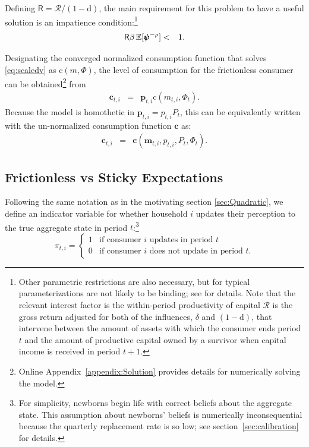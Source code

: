 \documentclass[titlepage]{./econtex}
\begin{document}
Defining $\mathsf{R} = \mathscr{R}\big/(1-\mathrm{d})$, the main requirement for this problem to have a useful solution is an impatience condition:\footnote{Other parametric restrictions are also necessary, but for typical parameterizations are not likely to be binding; see \cite{BufferStockTheory} for details.  Note that the relevant interest factor is the within-period productivity of capital $\mathscr{R}$ is the gross return adjusted for both of the influences, $\delta$ and $(1-\mathrm{d})$, that intervene between the amount of assets with which the consumer ends period $t$ and the amount of productive capital owned by a survivor when capital income is received in period $t+1$.  }
\begin{eqnarray*}
  \label{eq:impatience}
  \mathsf{R} \beta  \operatorname{\mathbb{E}}[ \pmb{\psi}^{-\rho}]  & < & 1.
\end{eqnarray*}
 
Designating the converged normalized consumption function that solves \eqref{eq:scaledv} as
$\mathrm{c}(m,\Phi)$, the level of consumption for the frictionless consumer can be obtained\footnote{Online Appendix~\ref{appendix:Solution}
provides details for numerically solving the model.} from
\begin{eqnarray}
  \label{eq:cFlevel}
   \mathbf{c}_{t,i} & = & \pmb{p}_{t,i} \mathrm{c}(m_{t,i},\Phi_t)  \nonumber
.
\end{eqnarray}
 Because the model is homothetic in $\pmb{p}_{t,i}={p}_{t,i} {P}_{t}$, this can be equivalently written with the un-normalized consumption function $\textbf{c}$ as:
\begin{eqnarray*}
\mathbf{c}_{t,i} & = & \textbf{c}(\mathbf{m}_{t,i}, p_{t,i}, {P}_t, {\Phi}_t).
\end{eqnarray*}


\subsection{Frictionless vs Sticky Expectations}\label{sec:StickySOE}

Following the same notation as in the motivating section \ref{sec:Quadratic}, we define an indicator variable for whether household $i$ updates their perception to the true aggregate state in period $t$:\footnote{For simplicity, newborns begin life with correct beliefs about the aggregate state.  This assumption about newborns' beliefs is numerically inconsequential because the quarterly replacement rate is so low; see section~\ref{sec:calibration} for details.}
\begin{equation*}
\pi_{t,i} =
\begin{cases}
   1 & \text{if consumer $i$ updates in period $t$}
\\ 0 & \text{if consumer $i$ does not update in period $t$}.
\end{cases}
\end{equation*}
\end{document}
